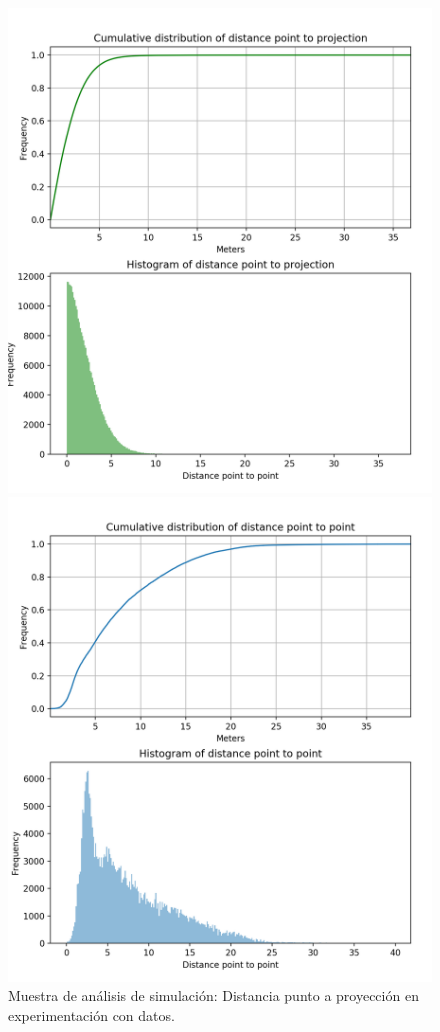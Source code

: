 \begin{figure}[!htb]
\begin{minipage}{0.48\textwidth}
\centering
\includegraphics[width=1.2\textwidth]{./Imagenes/SimulateCumulativePointProjection.png}
\caption{Muestra de análisis de simulación: Distancia punto a proyección en experimentación con datos.}
\label{figure:SimulatedPointToProjection}
\end{minipage}\hfill
\begin{minipage}{0.48\textwidth}
\centering
\includegraphics[width=1.2\textwidth]{./Imagenes/SimulateCumulativePointPoint.png}

\end{minipage}
\end{figure}
